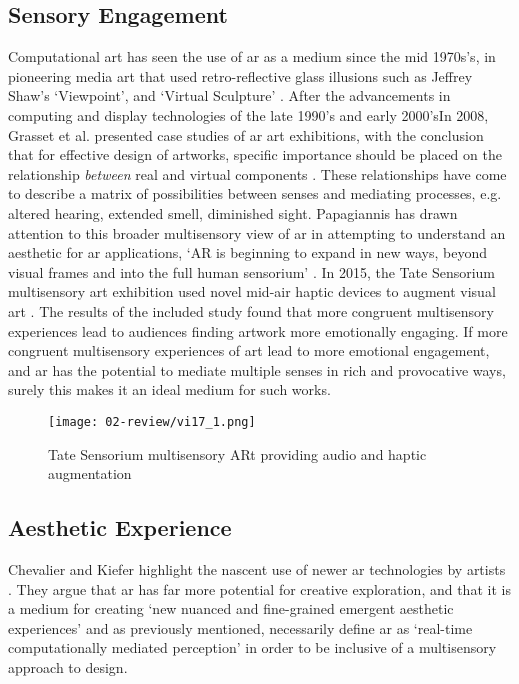 \subsection{Sensory Engagement}\label{sec: ar-arts-sensory}
Computational art has seen the use of \gls{ar} as a medium since the mid 1970s's, in pioneering media art that used retro-reflective glass illusions such as Jeffrey Shaw's `Viewpoint', and `Virtual Sculpture' \citeyearpar{shaw1975,shaw1981}. After the advancements in computing and display technologies of the late 1990's and early 2000'sIn 2008, Grasset et al. presented case studies of \gls{ar} art exhibitions, with the conclusion that for effective design of artworks, specific importance should be placed on the relationship \textit{between} real and virtual components \citeyearpar{grasset2008}. These relationships have come to describe a matrix of possibilities between senses and mediating processes, e.g. altered hearing, extended smell, diminished sight. Papagiannis has drawn attention to this broader multisensory view of \gls{ar} in attempting to understand an aesthetic for \gls{ar} applications, `AR is beginning to expand in new ways, beyond visual frames and into the full human sensorium' \citeyearpar{papagiannis2014}. In 2015, the Tate Sensorium multisensory art exhibition used novel mid-air haptic devices to augment visual art \citep{vi2017a}. The results of the included study found that more congruent multisensory experiences lead to audiences finding artwork more emotionally engaging. If more congruent multisensory experiences of art lead to more emotional engagement, and \gls{ar} has the potential to mediate multiple senses in rich and provocative ways, surely this makes it an ideal medium for such works. 

\begin{figure}[ht]
    \centering
    \texttt{[image: 02-review/vi17\_1.png]}
    \captionsetup{justification=centering,margin=1.5cm}
    \caption{Tate Sensorium multisensory ARt providing audio and haptic augmentation \citep[in][]{vi2017a}}\label{fig: tate}
\end{figure}

\subsection{Aesthetic Experience}\label{sec: ar-arts-aesthetics}
Chevalier and Kiefer highlight the nascent use of newer \gls{ar} technologies by artists \citeyearpar{chevalier2020}. They argue that \gls{ar} has far more potential for creative exploration, and that it is a medium for creating `new nuanced and fine-grained emergent aesthetic experiences' and as previously mentioned, necessarily define \gls{ar} as `real-time computationally mediated perception' in order to be inclusive of a multisensory approach to design. 

